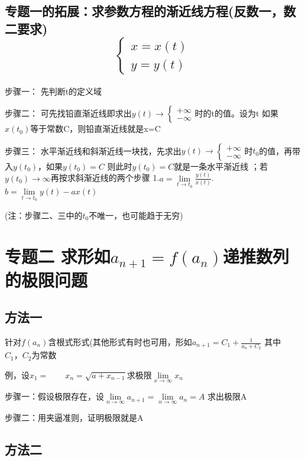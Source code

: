 \documentclass[a4paper,11pt]{book}
\begin{document}
\subsection*{专题一的拓展：求参数方程的渐近线方程(反数一，数二要求) \[\left\{\begin{array}{l}
    x=x(t) \\
    y=y(t)
    \end{array}\right.\]}
步骤一： 先判断t的定义域


\noindent 步骤二： 可先找铅直渐近线即求出$y(t)\rightarrow\left\{\begin{array}{l}
     +\infty \\
     -\infty
\end{array}\right.$时的t的值。设为t 如果$x(t_{0})$等于常数C，则铅直渐近线就是x=C

\noindent 步骤三： 水平渐近线和斜渐近线一块找，先求出$y(t)\rightarrow\left\{\begin{array}{l}
    +\infty \\
    -\infty
\end{array}\right.$时$t_{0}$的值，再带入$y(t_{0})$，如果$y(t_{0})=C$
则此时$y(t_{0})=C$就是一条水平渐近线
；若$y(t_{0})\rightarrow \infty$再按求斜渐近线的两个步骤
1.$a=\lim \limits _{t \rightarrow t_{0}}\frac{y(t)}{x(t)}$.$b=\lim \limits_{t \rightarrow t_{0}}y(t)-ax(t)$


(注：步骤二、三中的$t_0$不唯一，也可能趋于无穷)

\section*{专题二  \quad 求形如$a_{n+1}=f(a_{n})$递推数列的极限问题}
\subsection*{方法一}
针对$f(a_{n})$含根式形式(其他形式有时也可用，形如$a_{n+1}=C_{1}+\frac{1}{a_{n}+C_{2}}$
其中$C_{1}，C_{2}$为常数

\vspace{2ex}
例，设$x_{1}= \qquad x_{n}=\sqrt{a+x_{n-1}}$求极限$\lim \limits _{x \rightarrow \infty}x_{n}$

步骤一：假设极限存在，设$\lim \limits _{n \rightarrow \infty}a_{n+1}=\lim \limits _{n \rightarrow \infty}a_{n}=A$
求出极限A

步骤二：用夹逼准则，证明极限就是A

\subsection*{方法二}
\end{document}
